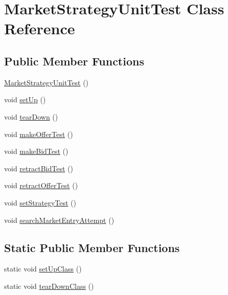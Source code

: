 \hypertarget{class_market_strategy_unit_test}{\section{Market\+Strategy\+Unit\+Test Class Reference}
\label{class_market_strategy_unit_test}
}
\subsection*{Public Member Functions}
\begin{DoxyCompactItemize}
\item 
\hyperlink{class_market_strategy_unit_test_ae43ac2b179784a2176d37163c075fe7d}{Market\+Strategy\+Unit\+Test} ()
\item 
void \hyperlink{class_market_strategy_unit_test_aab34abed7a4e3829160450b21793da17}{set\+Up} ()
\item 
void \hyperlink{class_market_strategy_unit_test_afa4e0a0e8292236fbcf994dc042741fb}{tear\+Down} ()
\item 
void \hyperlink{class_market_strategy_unit_test_ab814f5c9983e0eaa02f7c5040b81971a}{make\+Offer\+Test} ()
\item 
void \hyperlink{class_market_strategy_unit_test_a98b0ebe10401ed5d3c9af160dfcb8f2a}{make\+Bid\+Test} ()
\item 
void \hyperlink{class_market_strategy_unit_test_aa0b0a03a9824cd06bc94c68d9c45042f}{retract\+Bid\+Test} ()
\item 
void \hyperlink{class_market_strategy_unit_test_a045225ba03abd2845f49e6c0e065712a}{retract\+Offer\+Test} ()
\item 
void \hyperlink{class_market_strategy_unit_test_ac701e483e622d7a918f1b8f21f024108}{set\+Strategy\+Test} ()
\item 
void \hyperlink{class_market_strategy_unit_test_a090ee23fae74dd8351ad91f17c784627}{search\+Market\+Entry\+Attempt} ()
\end{DoxyCompactItemize}
\subsection*{Static Public Member Functions}
\begin{DoxyCompactItemize}
\item 
static void \hyperlink{class_market_strategy_unit_test_ab6f9926edcaa9511516b0b3bb1025b9f}{set\+Up\+Class} ()
\item 
static void \hyperlink{class_market_strategy_unit_test_aeb485798bfb7f18a04b6355e6f2a2581}{tear\+Down\+Class} ()
\end{DoxyCompactItemize}


